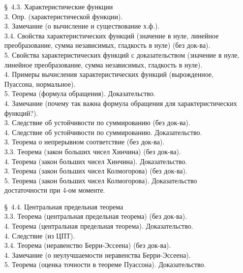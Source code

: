 \documentclass[10pt]{amsart}
\begin{document}
\begin{enumerate}
\begin{enumerate}
         
    
\item[\S\, 4.3.] Характеристические функции \\
3. Опр. (характеристической функции). \\
3. Замечание (о вычисление и существование х.ф.). \\
3.4. Свойства характеристических функций (значение в нуле, линейное преобразование, сумма независимых, гладкость в нуле) (без док-ва). \\
5. Свойства характеристических функций с доказательством (значение в нуле, линейное преобразование, сумма независимых, гладкость в нуле). \\
4. Примеры вычисления характеристических функций (вырожденное, Пуассона, нормальное). \\
5. Теорема (формула обращения). Доказательство. \\
4. Замечание (почему так важна формула обращения для характеристических функций?). \\
3. Следствие об устойчивости по суммированию (без док-ва). \\
4. Следствие об устойчивости по суммированию. Доказательство. \\
3. Теорема о непрерывном соответствие (без док-ва). \\
3.3. Теорема (закон больших чисел Хинчина) (без док-ва). \\
4. Теорема (закон больших чисел Хинчина).  Доказательство. \\
3. Теорема (закон больших чисел Колмогорова) (без док-ва). \\
5. Теорема (закон больших чисел Колмогорова). Доказательство достаточности при 4-ом моменте. \\

 

\item[\S\, 4.4.] Центральная предельная теорема \\
3.3. Теорема (центральная предельная теорема) (без док-ва). \\
4. Теорема (центральная предельная теорема). Доказательство. \\        
4. Следствие (из ЦПТ). \\
3.4. Теорема (неравенство Берри-Эссеена) (без док-ва). \\
4. Замечание (о неулучшаемости неравенства Берри-Эссеена). \\
5. Теорема (оценка точности в теореме Пуассона). Доказательство. \\
    









    \end{enumerate}
    

\end{enumerate}
\end{document}
